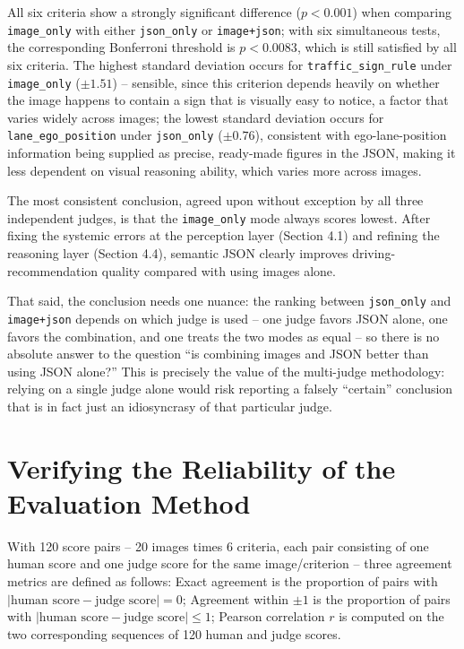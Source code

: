 \documentclass[12pt,a4paper]{report}
\begin{document}
All six criteria show a strongly significant difference ($p<0.001$) when comparing \texttt{image\_only} with either \texttt{json\_only} or \texttt{image+json}; with six simultaneous tests, the corresponding Bonferroni threshold is $p<0.0083$, which is still satisfied by all six criteria. The highest standard deviation occurs for \texttt{traffic\_sign\_rule} under \texttt{image\_only} ($\pm 1.51$) -- sensible, since this criterion depends heavily on whether the image happens to contain a sign that is visually easy to notice, a factor that varies widely across images; the lowest standard deviation occurs for \texttt{lane\_ego\_position} under \texttt{json\_only} ($\pm 0.76$), consistent with ego-lane-position information being supplied as precise, ready-made figures in the JSON, making it less dependent on visual reasoning ability, which varies more across images.

The most consistent conclusion, agreed upon without exception by all three independent judges, is that the \texttt{image\_only} mode always scores lowest. After fixing the systemic errors at the perception layer (Section 4.1) and refining the reasoning layer (Section 4.4), semantic JSON clearly improves driving-recommendation quality compared with using images alone.

That said, the conclusion needs one nuance: the ranking between \texttt{json\_only} and \texttt{image+json} depends on which judge is used -- one judge favors JSON alone, one favors the combination, and one treats the two modes as equal -- so there is no absolute answer to the question ``is combining images and JSON better than using JSON alone?'' This is precisely the value of the multi-judge methodology: relying on a single judge alone would risk reporting a falsely ``certain'' conclusion that is in fact just an idiosyncrasy of that particular judge.

\section{Verifying the Reliability of the Evaluation Method}

With 120 score pairs -- 20 images times 6 criteria, each pair consisting of one human score and one judge score for the same image/criterion -- three agreement metrics are defined as follows: Exact agreement is the proportion of pairs with $|\text{human score} - \text{judge score}| = 0$; Agreement within $\pm 1$ is the proportion of pairs with $|\text{human score} - \text{judge score}| \le 1$; Pearson correlation $r$ is computed on the two corresponding sequences of 120 human and judge scores.
\end{document}
